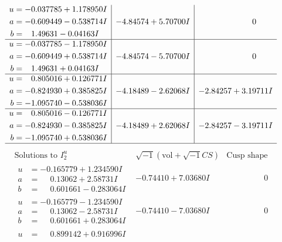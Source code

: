 \documentclass[1p]{elsarticle_modified}
\theoremstyle{definition}
\newcommand{\I}{\sqrt{-1}}
\begin{document}
$$\begin{array}{c|c|c}
\begin{aligned}
u &= -0.037785 + 1.178950 I \\
a &= -0.609449 - 0.538714 I \\
b &= \phantom{-}1.49631 - 0.04163 I\end{aligned}
 & -4.84574 + 5.70700 I & \phantom{-0.000000 } 0 \\ \hline\begin{aligned}
u &= -0.037785 - 1.178950 I \\
a &= -0.609449 + 0.538714 I \\
b &= \phantom{-}1.49631 + 0.04163 I\end{aligned}
 & -4.84574 - 5.70700 I & \phantom{-0.000000 } 0 \\ \hline\begin{aligned}
u &= \phantom{-}0.805016 + 0.126771 I \\
a &= -0.824930 + 0.385825 I \\
b &= -1.095740 - 0.538036 I\end{aligned}
 & -4.18489 - 2.62068 I & -2.84257 + 3.19711 I \\ \hline\begin{aligned}
u &= \phantom{-}0.805016 - 0.126771 I \\
a &= -0.824930 - 0.385825 I \\
b &= -1.095740 + 0.538036 I\end{aligned}
 & -4.18489 + 2.62068 I & -2.84257 - 3.19711 I\\
 \hline 
 \end{array}$$\newpage$$\begin{array}{c|c|c}  
\text{Solutions to }I^u_{2}& \I (\text{vol} + \sqrt{-1}CS) & \text{Cusp shape}\\
 \hline 
\begin{aligned}
u &= -0.165779 + 1.234590 I \\
a &= \phantom{-}0.13062 + 2.58731 I \\
b &= \phantom{-}0.601661 - 0.283064 I\end{aligned}
 & -0.74410 + 7.03680 I & \phantom{-0.000000 } 0 \\ \hline\begin{aligned}
u &= -0.165779 - 1.234590 I \\
a &= \phantom{-}0.13062 - 2.58731 I \\
b &= \phantom{-}0.601661 + 0.283064 I\end{aligned}
 & -0.74410 - 7.03680 I & \phantom{-0.000000 } 0 \\ \hline\begin{aligned}
u &= \phantom{-}0.899142 + 0.916996 I \\

\end{aligned}
\end{array}$$
\end{document}
